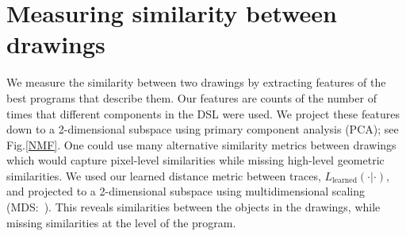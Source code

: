 \documentclass{article}
\begin{document}
\section{Measuring similarity between drawings}

We measure the similarity between two drawings by extracting features
of the best programs that describe them. Our features are counts of the number of times that different components in the
DSL were used.  We project these features down to a
2-dimensional subspace using primary component analysis
(PCA); see Fig.\ref{NMF}.  One could use many
alternative similarity metrics between drawings which would capture pixel-level similarities while missing high-level geometric similarities.
We used our learned distance metric between traces, $L_{\text{learned}}(\cdot|\cdot)$, and projected to a 2-dimensional subspace using multidimensional scaling (MDS:~\cite{cox2008multidimensional}). This reveals similarities between the objects in the drawings,
while missing similarities at the level of the program.
\end{document}
